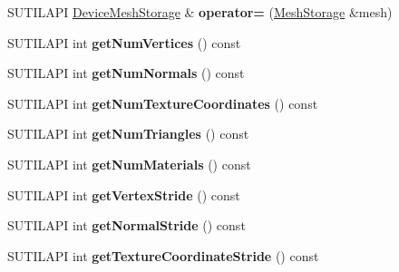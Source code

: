 \begin{DoxyCompactItemize}
\item 
\mbox{\label{class_device_mesh_storage_a5db77e3c9ee56937d6c6e60e0191b466}} 
S\+U\+T\+I\+L\+A\+PI \hyperlink{class_device_mesh_storage}{Device\+Mesh\+Storage} \& {\bfseries operator=} (\hyperlink{class_mesh_storage}{Mesh\+Storage} \&mesh)
\item 
\mbox{\label{class_device_mesh_storage_a1ebdcdd010e65a9481e98a5cb58e454b}} 
S\+U\+T\+I\+L\+A\+PI int {\bfseries get\+Num\+Vertices} () const
\item 
\mbox{\label{class_device_mesh_storage_a5d1e05d7428995a1c91ad0c4160a4984}} 
S\+U\+T\+I\+L\+A\+PI int {\bfseries get\+Num\+Normals} () const
\item 
\mbox{\label{class_device_mesh_storage_a7722196fb7e42488e8edb839eeca23da}} 
S\+U\+T\+I\+L\+A\+PI int {\bfseries get\+Num\+Texture\+Coordinates} () const
\item 
\mbox{\label{class_device_mesh_storage_adbe8e23c4ac35cb7989ba2cfa7bd87a6}} 
S\+U\+T\+I\+L\+A\+PI int {\bfseries get\+Num\+Triangles} () const
\item 
\mbox{\label{class_device_mesh_storage_ab460298be542213b1158137a680b6f22}} 
S\+U\+T\+I\+L\+A\+PI int {\bfseries get\+Num\+Materials} () const
\item 
\mbox{\label{class_device_mesh_storage_a8c25e783114d3ac28d538c15c7c8161c}} 
S\+U\+T\+I\+L\+A\+PI int {\bfseries get\+Vertex\+Stride} () const
\item 
\mbox{\label{class_device_mesh_storage_a4e9565ae57a457f58642aec29c0ea710}} 
S\+U\+T\+I\+L\+A\+PI int {\bfseries get\+Normal\+Stride} () const
\item 
\mbox{\label{class_device_mesh_storage_a2baa5c4be243b7faa579baab890ea087}} 
S\+U\+T\+I\+L\+A\+PI int {\bfseries get\+Texture\+Coordinate\+Stride} () const
\item 
\mbox{\label{class_device_mesh_storage_af53b40a8f1fe947c80feb23ffcde088f}} 

\end{DoxyCompactItemize}

